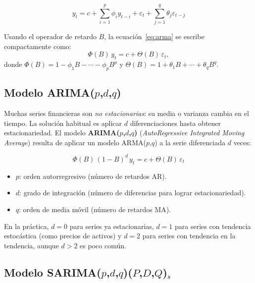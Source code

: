 \documentclass[12pt, a4paper]{article}
\begin{document}
\begin{defbox}
\begin{equation}
  y_t = c + \sum_{i=1}^{p}\phi_i y_{t-i} + \varepsilon_t + \sum_{j=1}^{q}\theta_j \varepsilon_{t-j}
  \label{eq:arma}
\end{equation}
\end{defbox}

Usando el operador de retardo $B$, la ecuación~\eqref{eq:arma} se escribe
compactamente como:
\begin{equation}
  \Phi(B)\, y_t = c + \Theta(B)\, \varepsilon_t,
\end{equation}
donde $\Phi(B) = 1 - \phi_1 B - \cdots - \phi_p B^p$ y
$\Theta(B) = 1 + \theta_1 B + \cdots + \theta_q B^q$.

\subsection{Modelo ARIMA($p$,$d$,$q$)}

Muchas series financieras son \emph{no estacionarias}: su media o varianza
cambia en el tiempo. La solución habitual es aplicar $d$ diferenciaciones
hasta obtener estacionariedad. El modelo \textbf{ARIMA($p$,$d$,$q$)}
(\textit{AutoRegressive Integrated Moving Average}) resulta de aplicar un
modelo ARMA($p$,$q$) a la serie diferenciada $d$ veces:

\begin{defbox}
\begin{equation}
  \Phi(B)\,(1 - B)^d\, y_t = c + \Theta(B)\, \varepsilon_t
  \label{eq:arima}
\end{equation}
\end{defbox}

\begin{itemize}[leftmargin=*]
  \item $p$: orden autorregresivo (número de retardos AR).
  \item $d$: grado de integración (número de diferencias para lograr estacionariedad).
  \item $q$: orden de media móvil (número de retardos MA).
\end{itemize}

En la práctica, $d = 0$ para series ya estacionarias, $d = 1$ para series
con tendencia estocástica (como precios de activos) y $d = 2$ para series
con tendencia en la tendencia, aunque $d > 2$ es poco común.

\subsection{Modelo SARIMA($p$,$d$,$q$)($P$,$D$,$Q$)$_s$}
\end{document}
